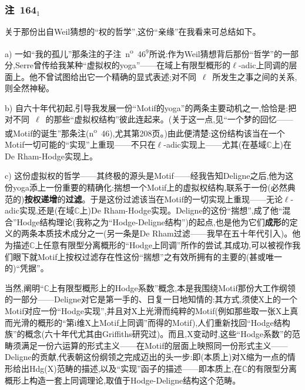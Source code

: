 \subsubsection*{注~164$_{1}$}

\dmark{}关于那份出自Weil猜想的“权的哲学”,这份“亲缘”在我看来可总结如下。

a) 一如“我的孤儿”那条注的子注~n\textsuperscript{o}~46$^9$所说:作为Weil猜想背后那份“哲学”的一部分,Serre曾传给我某种“虚拟权的yoga”——在域上有限型概形的$\ell$-adic上同调的层面上。他不曾试图给出它一个精确的显式表述;对不同~$\ell$~所发生之事之间的关系,则全然神秘。

b) 自六十年代初起,引导我发展一份“Motif的yoga”的两条主要动机之一,恰恰是:把对不同~$\ell$~的那些“虚拟权结构”彼此连起来。(关于这一点,见“一个梦的回忆——或Motif的诞生”那条注(n\textsuperscript{o}~46),尤其第208页。)由此便清楚:这份结构该当在一个Motif一切可能的“实现”上重现——不只在$\ell$-adic实现上——尤其(在基域$\mathbb{C}$上)在De Rham-Hodge实现上。

c) 这份虚拟权的哲学——其终极的源头是Motif——经我告知Deligne之后,他为这份yoga添上一份重要的精确化:揣想一个Motif上的虚拟权结构,联系于一份(必然典范的)\textbf{按权递增}的\textbf{过滤}。于是这份过滤该当在Motif的一切实现上重现——无论$\ell$-adic实现,还是(在域$\mathbb{C}$上)De Rham-Hodge实现。Deligne的这份“揣想”,成了他“混合”Hodge结构理论(我称之为“Hodge-Deligne结构”)的起点,也是他为它们\textbf{成形}的定义的两条本质技术成分之一(另一条是De Rham过滤——我早在五十年代引入)。他为描述$\mathbb{C}$上任意有限型分离概形的“Hodge上同调”所作的尝试,其成功,可以被视作我们眼下就Motif上按权过滤存在性这份“揣想”之有效所拥有的主要的(甚或唯一的)“凭据”。

当然,阐明“$\mathbb{C}$上有限型概形上的Hodge系数”概念,本是我围绕Motif那份大工作纲领的一部分——Deligne对它是第一手的、日复一日地知情的:其方式,须使X上的一个Motif对应一份“Hodge实现”,并且对X上光滑而纯粹的Motif(例如那些取一张X上真而光滑的概形的“第i维X上Motif上同调”而得的Motif\dmark{}),人们重新找回“Hodge结构族”的概念(六十年代尤其由Griffiths研究过)。而且,X变动时,这些“Hodge系数”的范畴须满足一份六运算的形式主义——在Motif的层面上映照同一份形式主义——Deligne的贡献,代表朝这份纲领之完成迈出的头一步:即(本质上)对X缩为一点的情形给出Hdg(X)范畴的描述,以及“实现”函子的描述——即本质上,在$\mathbb{C}$的有限型分离概形上构造一套上同调理论,取值于Hodge-Deligne结构这个范畴。

